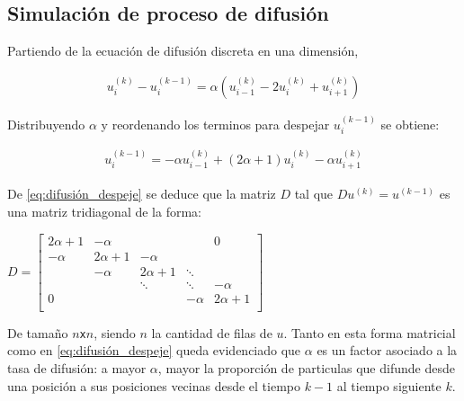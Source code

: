 \subsection{Simulaci\'on de proceso de difusi\'on}
\label{aplicaciones_difusion}

Partiendo de la ecuación de difusión discreta en una dimensión,

\begin{equation}
\begin{split}
    u_i^{(k)} - u_i^{(k-1)} = \alpha(u_{i-1}^{(k)} - 2u_i^{(k)} + u_{i+1}^{(k)})
\end{split}
\label{eq:difusión}
\end{equation}

Distribuyendo $\alpha$ y reordenando los terminos para despejar $u_i^{(k-1)}$ se obtiene:

\begin{equation}
\begin{split}
    u_i^{(k-1)} = -\alpha u_{i-1}^{(k)} + (2\alpha + 1) u_i^{(k)} - \alpha u_{i+1}^{(k)}
\end{split}
\label{eq:difusión_despeje}
\end{equation}

De \eqref{eq:difusión_despeje} se deduce que la matriz $D$ tal que $Du^{(k)} = u^{(k-1)}$ es una matriz tridiagonal de la forma:

\begin{center}
    $D = \begin{bmatrix}
        2\alpha + 1 & -\alpha     &             &         & 0           \\
        -\alpha     & 2\alpha + 1 & -\alpha     &         &             \\
                    & -\alpha     & 2\alpha + 1 & \ddots  &             \\
                    &             & \ddots      & \ddots  & -\alpha     \\
        0           &             &             & -\alpha & 2\alpha + 1 \\
    \end{bmatrix}$
\end{center}

De tamaño $n$\texttt{x}$n$, siendo $n$ la cantidad de filas de $u$. 
\clearpage
Tanto en esta forma matricial como en \eqref{eq:difusión_despeje} queda evidenciado que $\alpha$ es un factor asociado a la tasa de difusión: a mayor $\alpha$, mayor la proporción de particulas que difunde desde una posición a sus posiciones vecinas desde el tiempo $k-1$ al tiempo siguiente $k$. 

